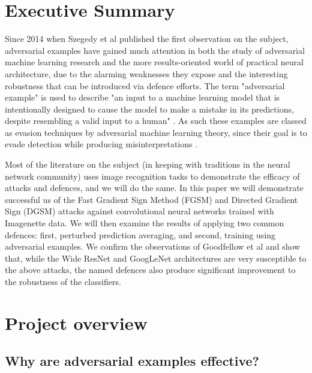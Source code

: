 \documentclass[conference]{IEEEtran}
\begin{document}
\tableofcontents%

\bigskip

\section{Executive Summary}

Since 2014 when Szegedy et al \cite{szegedy2014intriguing} published the
first observation on the subject, adversarial examples have gained much
attention in both the study of adversarial machine learning research and the
more results-oriented world of practical neural architecture, due to the
alarming weaknesses they expose and the interesting robustness that can be
introduced via defence efforts. The term "adversarial example" is used to
describe "an input to a machine learning model that is intentionally
designed to cause the model to make a mistake in its predictions, despite
resembling a valid input to a human" \cite{wiyatno2019adversarial}. As such
these examples are classed as evasion techniques by adversarial machine
learning theory, since their goal is to evade detection while producing
misinterpretations \cite{wiki:aml}.

Most of the literature on the subject (in keeping with traditions in the
neural network community) uses image recognition tasks to demonstrate the
efficacy of attacks and defences, and we will do the same. In this paper we
will demonstrate successful us of the Fast Gradient Sign Method (FGSM) \cite%
{goodfellow2014explaining} and Directed Gradient Sign (DGSM) \cite%
{madry2020adversarial} attacks against convolutional neural networks trained
with Imagenette data. We will then examine the results of applying two
common defences: first, perturbed prediction averaging, and second, training
using adversarial examples. We confirm the observations of Goodfellow et al 
\cite{goodfellow2014explaining} and show that, while the Wide ResNet and
GoogLeNet architectures are very susceptible to the above attacks, the named
defences also produce significant improvement to the robustness of the
classifiers.

\section{Project overview}

\subsection{Why are adversarial examples effective?}
\end{document}
